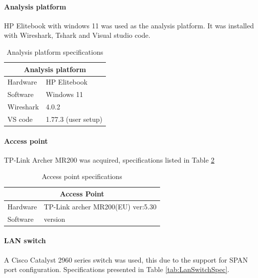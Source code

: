 \paragraph{Analysis platform}
HP Elitebook with windows 11 was used as the analysis platform. It was installed with Wireshark, Tshark and Visual studio code. 

\begin{table}[H]
\centering
\caption{Analysis platform specifications}
\label{tab:AnalysisPlatfromSpec}
\begin{tabular}{|ll|}
\hline
\multicolumn{2}{|c|}{\textbf{Analysis platform}}      \\ \hline
\multicolumn{1}{|l|}{Hardware}  & HP Elitebook        \\ \hline
\multicolumn{1}{|l|}{Software}  & Windows 11          \\ \hline
\multicolumn{1}{|l|}{Wireshark} & 4.0.2               \\ \hline
\multicolumn{1}{|l|}{VS code}   & 1.77.3 (user setup) \\ \hline
\end{tabular}
\end{table}

\paragraph{Access point}
TP-Link Archer MR200 was acquired, specifications listed in Table \ref{tab:AccessPointSpec} 

\begin{table}[H]
\centering
\caption{Access point specifications}
\label{tab:AccessPointSpec}
\begin{tabular}{|ll|}
\hline
\multicolumn{2}{|c|}{\textbf{Access Point}}                        \\ \hline
\multicolumn{1}{|l|}{Hardware} & TP-Link archer MR200(EU) ver:5.30 \\ \hline
\multicolumn{1}{|l|}{Software} & version                           \\ \hline
\end{tabular}
\end{table}

\paragraph{LAN switch}
A Cisco Catalyst 2960 series switch was used, this due to the support for SPAN port configuration. Specifications presented in Table \ref{tab:LanSwitchSpec}.

